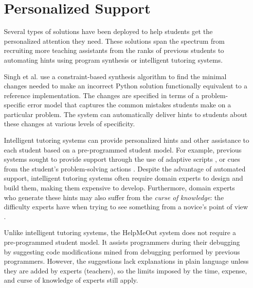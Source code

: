 \section{Personalized Support}
Several types of solutions have been deployed to help students get the personalized attention they need. These solutions span the spectrum from recruiting more teaching assistants from the ranks of previous students \cite{communityTAs} to automating hints using program synthesis or intelligent tutoring systems. 

Singh et al. \cite{rishabh} use a constraint-based synthesis algorithm to find the minimal changes needed to make an incorrect Python solution functionally equivalent to a reference implementation. The changes are specified in terms of a problem-specific error model that captures the common mistakes students make on a particular problem. The system can automatically deliver hints to students about these changes at various levels of specificity. 

Intelligent tutoring systems can provide personalized hints and other assistance to each student based on a pre-programmed student model. For example, previous systems sought to provide support through the use of adaptive scripts \cite{kumar2007tutorial}, or cues from the student’s problem-solving actions \cite{diziol}. Despite the advantage of automated support, intelligent tutoring systems often require domain experts to design and build them, making them expensive to develop.  Furthermore, domain experts who generate these hints may also suffer from the {\it curse of knowledge}: the difficulty experts have when trying to see something from a novice's point of view \cite{curse}. 

Unlike intelligent tutoring systems, the HelpMeOut system \cite{helpmeout} does not require a pre-programmed student model. It assists programmers during their debugging by suggesting code modifications mined from debugging performed by previous programmers. However, the suggestions lack explanations in plain language unless they are added by experts (teachers), so the limits imposed by the time, expense, and curse of knowledge of experts still apply.

